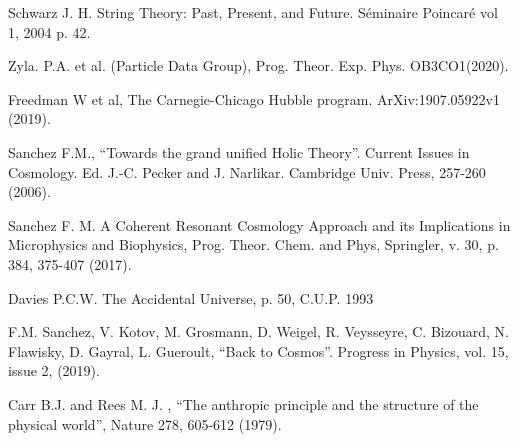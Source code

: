 \documentclass[a4paper,9pt]{article}
\begin{document}
  
\begin{thebibliography}{99}



 Schwarz J. H. String Theory: Past, Present, and Future. Séminaire Poincaré vol 1, 2004 p. 42.

 Zyla. P.A. et al. (Particle Data Group), Prog. Theor. Exp. Phys. OB3CO1(2020).


 Freedman W et al, The Carnegie-Chicago Hubble program. ArXiv:1907.05922v1 (2019).


 Sanchez F.M., “Towards the grand unified Holic Theory”. Current Issues in Cosmology. Ed. J.-C. Pecker and J. Narlikar. Cambridge Univ. Press, 257-260 (2006).



 Sanchez F. M. A Coherent Resonant Cosmology Approach and its Implications in Microphysics and Biophysics, Prog. Theor. Chem. and Phys, Springler, v. 30, p. 384, 375-407 (2017).

 Davies P.C.W. The Accidental Universe, p. 50, C.U.P. 1993


 F.M. Sanchez, V. Kotov, M. Grosmann, D. Weigel, R. Veysseyre, C. Bizouard, N. Flawisky, D. Gayral, L. Gueroult, ``Back to Cosmos''. Progress in Physics, vol. 15, issue 2, (2019).


 Carr B.J. and Rees M. J. , “The anthropic principle and the structure of the physical world”, Nature 278, 605-612 (1979).





\end{thebibliography}
\end{document}
